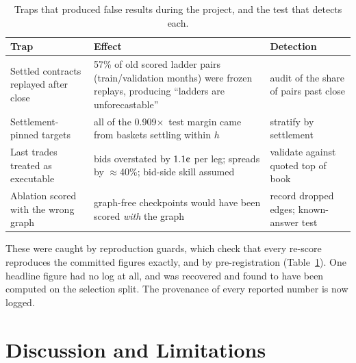 \documentclass[11pt,a4paper]{article}
\newcommand{\cent}{\text{\textcent}}
\newcommand{\x}{\ensuremath{\times}}
\begin{document}
\begin{table}[h]
\centering
\caption{Traps that produced false results during the project, and the test
that detects each.}
\label{tab:pitfalls}
\begin{tabular}{p{4.1cm}p{5.6cm}p{4.3cm}}
\toprule
Trap & Effect & Detection \\
\midrule
Settled contracts replayed after close & 57\% of old scored ladder pairs (train/validation months) were
frozen replays, producing ``ladders are unforecastable'' & audit of the share of
pairs past close \\
Settlement-pinned targets & all of the 0.909\x\ test margin came from baskets
settling within $h$ & stratify by settlement \\
Last trades treated as executable & bids overstated by $1.1\cent$ per leg;
spreads by $\approx$40\%; bid-side skill assumed & validate against quoted top
of book \\
Ablation scored with the wrong graph & graph-free checkpoints would have been
scored \emph{with} the graph & record dropped edges; known-answer test \\
\bottomrule
\end{tabular}
\end{table}

These were caught by reproduction guards, which check that every re-score
reproduces the committed figures exactly, and by pre-registration
(Table~\ref{tab:pitfalls}). One headline figure had no log at all, and was
recovered and found to have been computed on the selection split. The
provenance of every reported number is now logged.

\section{Discussion and Limitations}
\end{document}

